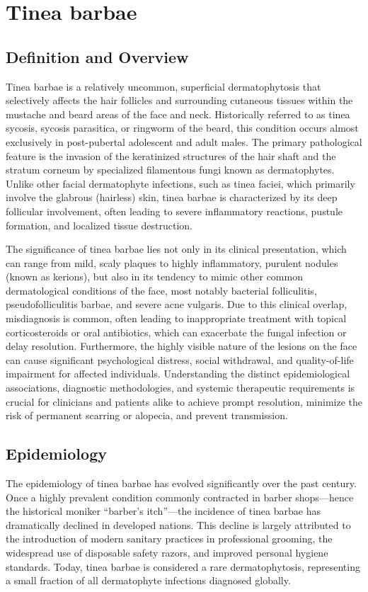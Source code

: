 \chapter{Tinea barbae}

\section*{Definition and Overview}
Tinea barbae is a relatively uncommon, superficial dermatophytosis that selectively affects the hair follicles and surrounding cutaneous tissues within the mustache and beard areas of the face and neck. Historically referred to as tinea sycosis, sycosis parasitica, or ringworm of the beard, this condition occurs almost exclusively in post-pubertal adolescent and adult males. The primary pathological feature is the invasion of the keratinized structures of the hair shaft and the stratum corneum by specialized filamentous fungi known as dermatophytes. Unlike other facial dermatophyte infections, such as tinea faciei, which primarily involve the glabrous (hairless) skin, tinea barbae is characterized by its deep follicular involvement, often leading to severe inflammatory reactions, pustule formation, and localized tissue destruction.

The significance of tinea barbae lies not only in its clinical presentation, which can range from mild, scaly plaques to highly inflammatory, purulent nodules (known as kerions), but also in its tendency to mimic other common dermatological conditions of the face, most notably bacterial folliculitis, pseudofolliculitis barbae, and severe acne vulgaris. Due to this clinical overlap, misdiagnosis is common, often leading to inappropriate treatment with topical corticosteroids or oral antibiotics, which can exacerbate the fungal infection or delay resolution. Furthermore, the highly visible nature of the lesions on the face can cause significant psychological distress, social withdrawal, and quality-of-life impairment for affected individuals. Understanding the distinct epidemiological associations, diagnostic methodologies, and systemic therapeutic requirements is crucial for clinicians and patients alike to achieve prompt resolution, minimize the risk of permanent scarring or alopecia, and prevent transmission.

\section*{Epidemiology}
The epidemiology of tinea barbae has evolved significantly over the past century. Once a highly prevalent condition commonly contracted in barber shops—hence the historical moniker ``barber's itch''—the incidence of tinea barbae has dramatically declined in developed nations. This decline is largely attributed to the introduction of modern sanitary practices in professional grooming, the widespread use of disposable safety razors, and improved personal hygiene standards. Today, tinea barbae is considered a rare dermatophytosis, representing a small fraction of all dermatophyte infections diagnosed globally.

